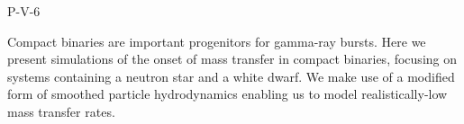 P-V-6


\bigskip



\bigskip

\noindent Compact binaries are important progenitors for gamma-ray bursts. Here we present simulations of the onset of mass transfer in compact binaries, focusing on systems containing a neutron star and a white dwarf. We make use of a modified form of smoothed particle hydrodynamics enabling us to model realistically-low mass transfer rates.


